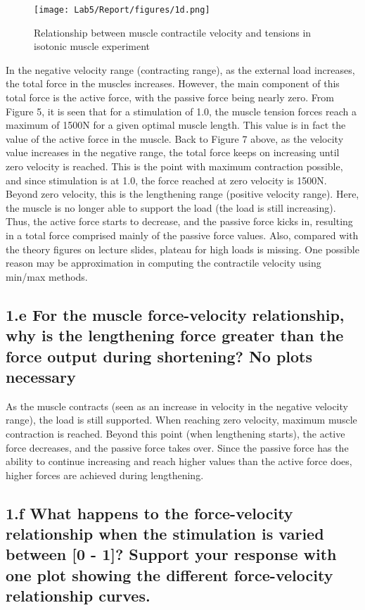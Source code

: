 \documentclass{cmc}
\begin{document}
  
\begin{figure}[H]
  \centering 
  \texttt{[image: Lab5/Report/figures/1d.png]}
  \caption{Relationship between muscle contractile velocity and tensions in isotonic muscle experiment}
  \label{1d}
\end{figure}

In the negative velocity range (contracting range), as the external load increases, the total force in the muscles increases. However, the main component of this total force is the active force, with the passive force being nearly zero. From Figure 5, it is seen that for a stimulation of 1.0, the muscle tension forces reach a maximum of 1500N for a given optimal muscle length. This value is in fact the value of the active force in the muscle. Back to Figure 7 above, as the velocity value increases in the negative range, the total force keeps on increasing until zero velocity is reached. This is the point with maximum contraction possible, and since stimulation is at 1.0, the force reached at zero velocity is 1500N. Beyond zero velocity, this is the lengthening range (positive velocity range). Here, the muscle is no longer able to support the load (the load is still increasing). Thus, the active force starts to decrease, and the passive force kicks in, resulting in a total force comprised mainly of the passive force values. Also, compared with the theory figures on lecture slides, plateau for high loads is missing. One possible reason may be approximation in computing the contractile velocity using min/max methods. 


\subsection*{1.e For the muscle force-velocity relationship, why is
  the lengthening force greater than the force output during
  shortening? No plots necessary}

As the muscle contracts (seen as an increase in velocity in the negative velocity range), the load is still supported. When reaching zero velocity, maximum muscle contraction is reached. Beyond this point (when lengthening starts), the active force decreases, and the passive force takes over. Since the passive force has the ability to continue increasing and reach higher values than the active force does, higher forces are achieved during lengthening. 

\subsection*{1.f What happens to the force-velocity relationship
  when the stimulation is varied between [0 - 1]? Support your
  response with one plot showing the different force-velocity
  relationship curves.  }
\end{document}
